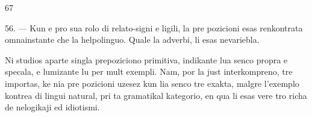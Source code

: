 \begin{VUpage}[71]{67}
\VUsaut{6.92mm}
\VUsaut{4.14mm}

56. --- Kun e pro sua rolo di relato-signi e ligili, la pre\cc
pozicioni esas renkontrata omnainstante che la helpolinguo.\nl
Quale la adverbi, li esas nevariebla.

Ni studios aparte singla prepoziciono primitiva, indikante\nl
lua senco propra e specala, e lumizante lu per mult exempli.\nl
Nam, por la just interkompreno, tre importas, ke nia pre\cc
pozicioni uzesez kun lia senco tre exakta, malgre l'exemplo\nl
kontrea di lingui natural, pri ta gramatikal kategorio, en\nl
qua li esas vere tro richa de nelogikaji ed idiotismi.
\end{VUpage}

